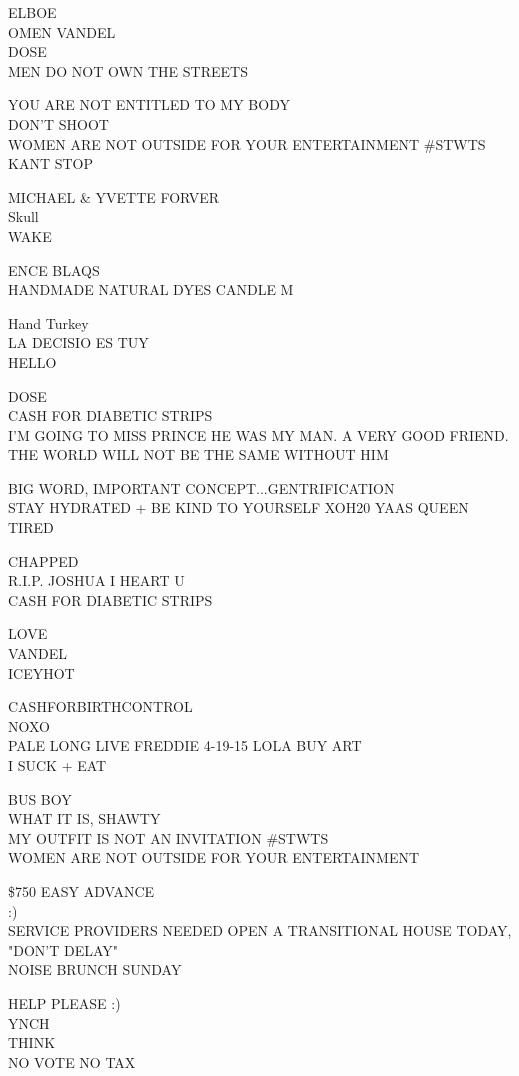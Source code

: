 \documentclass[10pt,letterpaper]{article}
\begin{document}
ELBOE\\
OMEN VANDEL\\
DOSE\\
MEN DO NOT OWN THE STREETS

YOU ARE NOT ENTITLED TO MY BODY\\
DON'T SHOOT\\
WOMEN ARE NOT OUTSIDE FOR YOUR ENTERTAINMENT \#STWTS\\
KANT STOP

MICHAEL \& YVETTE FORVER\\
Skull\\
WAKE

ENCE BLAQS\\
HANDMADE NATURAL DYES CANDLE M

Hand Turkey\\
LA DECISIO ES TUY\\
HELLO

DOSE\\
CASH FOR DIABETIC STRIPS\\
I'M GOING TO MISS PRINCE HE WAS MY MAN.  A VERY GOOD FRIEND.  THE WORLD WILL NOT BE THE SAME WITHOUT HIM

BIG WORD, IMPORTANT CONCEPT...GENTRIFICATION\\
STAY HYDRATED + BE KIND TO YOURSELF XOH20 YAAS QUEEN\\
TIRED

CHAPPED\\
R.I.P. JOSHUA I HEART U\\
CASH FOR DIABETIC STRIPS

LOVE\\
VANDEL\\
ICEYHOT

CASHFORBIRTHCONTROL\\
NOXO\\
PALE LONG LIVE FREDDIE 4{-}19{-}15 LOLA BUY ART\\
I SUCK + EAT

BUS BOY\\
WHAT IT IS, SHAWTY\\
MY OUTFIT IS NOT AN INVITATION \#STWTS\\
WOMEN ARE NOT OUTSIDE FOR YOUR ENTERTAINMENT

\$750 EASY ADVANCE\\
:)\\
SERVICE PROVIDERS NEEDED OPEN A TRANSITIONAL HOUSE TODAY, "DON'T DELAY"\\
NOISE BRUNCH SUNDAY

HELP PLEASE :)\\
YNCH\\
THINK\\
NO VOTE NO TAX
\end{document}
